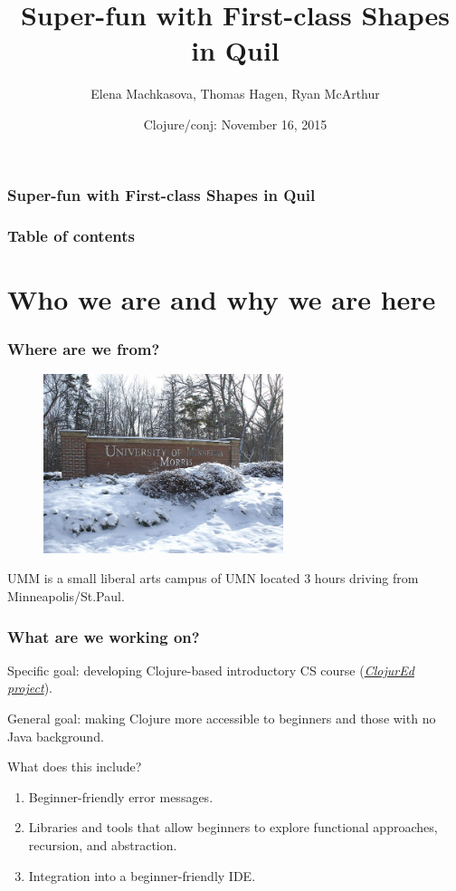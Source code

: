 \documentclass{beamer}
\begin{document}
\author{Elena Machkasova, Thomas Hagen, Ryan McArthur}
\title{Super-fun with First-class Shapes in Quil}
\date{Clojure/conj: November 16, 2015}


\begin{frame}
\frametitle {Super-fun with First-class Shapes in Quil}
\maketitle
\end{frame}

\begin{frame}
\frametitle{Table of contents}
\tableofcontents  
\end{frame}

\section{Who we are and why we are here}

\begin{frame}
\frametitle{Where are we from?}
\begin{figure}[h]
\includegraphics[width=7cm]{PresentationImages/umm-winter.jpg}
\end{figure}
UMM is a small liberal arts campus of UMN located 3 hours driving from Minneapolis/St.Paul. 
\end{frame}

\begin{frame}
\frametitle{What are we working on?}
Specific goal: developing Clojure-based introductory CS course ({\it \href{http://cda.morris.umn.edu/~elenam/\#clojure}{ClojurEd project}}). 

General goal: making Clojure more accessible to beginners and those with no Java background. 

What does this include? 
\begin{enumerate}
\item Beginner-friendly error messages. 
\item Libraries and tools that allow beginners to explore functional approaches, recursion, and abstraction.
\item Integration into a beginner-friendly IDE. 
\end{enumerate}
\end{frame}
\end{document}
